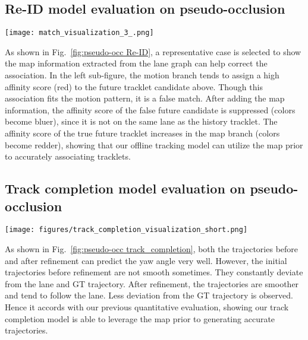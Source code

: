 \documentclass{article} \usepackage{iclr2023_conference,times}
\begin{document}
\subsection{Re-ID model evaluation on pseudo-occlusion}
\begin{figure*}[htb!]
\centering
\texttt{[image: match\_visualization\_3\_.png]}
\caption{Qualitative results of the Re-ID model evaluated with pseudo-occlusion. The history tracklets are green. Future tracklets are colored according to their affinity scores. Higher scores are represented in red and lower scores are in blue. The thin dotted lines represent the lanes from the semantic map. The left figure shows the prediction from the motion branch. The middle figure shows the prediction from the map branch, and the right figure shows the GT. }
\label{fig:pseudo-occ Re-ID}
\end{figure*}
As shown in Fig.~\ref{fig:pseudo-occ Re-ID}, a representative case is selected to show the map information extracted from the lane graph can help correct the association. In the left sub-figure, the motion branch tends to assign a high affinity score (red) to the future tracklet candidate above. Though this association fits the motion pattern, it is a false match. After adding the map information, the affinity score of the false future candidate is suppressed (colors become bluer), since it is not on the same lane as the history tracklet. The affinity score of the true future tracklet increases in the map branch (colors become redder), showing that our offline tracking model can utilize the map prior to accurately associating tracklets.

\subsection{Track completion model evaluation on pseudo-occlusion}
\begin{figure*}[htb!]
\centering
\texttt{[image: figures/track\_completion\_visualization\_short.png]}
\caption{Qualitative results of the track completion model evaluated with pseudo-occlusion. In the plot, 2 pairs of prediction results are shown. In each pair, the left image shows the decoded trajectory using only the motion feature, whereas the right image shows the trajectory after refinement. The history tracklets, future tracklets, predicted trajectories and GT trajectories correspond to the green, red, blue, and pink arrows respectively. The lanes are in orange.}
\label{fig:pseudo-occ track_completion} 
\end{figure*}
As shown in Fig.~\ref{fig:pseudo-occ track_completion}, both the trajectories before and after refinement can predict the yaw angle very well. However, the initial trajectories before refinement are not smooth sometimes. They constantly deviate from the lane and GT trajectory. After refinement, the trajectories are smoother and tend to follow the lane. Less deviation from the GT trajectory is observed. Hence it accords with our previous quantitative evaluation, showing our track completion model is able to leverage the map prior to generating accurate trajectories.
\end{document}
